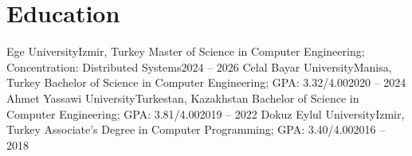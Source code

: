 \section{Education}
  \resumeSubHeadingListStart
    \resumeSubheading
      {Ege University}{Izmir, Turkey}
      {Master of Science in Computer Engineering; Concentration: Distributed Systems}{2024 -- 2026}
    \resumeSubheading
      {Celal Bayar University}{Manisa, Turkey}
      {Bachelor of Science in Computer Engineering; GPA: 3.32/4.00}{2020 -- 2024}
    \resumeSubheading
      {Ahmet Yassawi University}{Turkestan, Kazakhstan}
      {Bachelor of Science in Computer Engineering; GPA: 3.81/4.00}{2019 -- 2022}
    \resumeSubheading
      {Dokuz Eylul University}{Izmir, Turkey}
      {Associate's Degree in Computer Programming; GPA: 3.40/4.00}{2016 -- 2018}
  \resumeSubHeadingListEnd